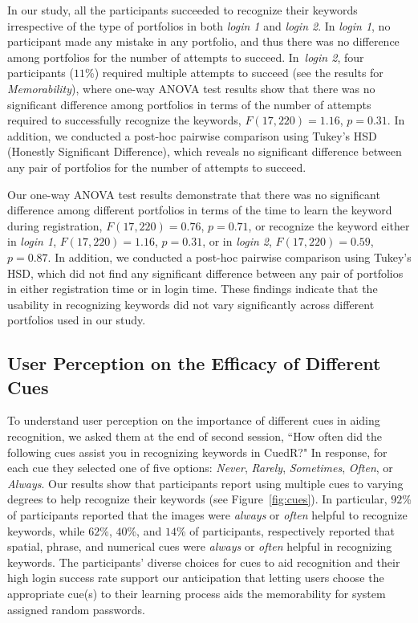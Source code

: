 In our study, all the participants succeeded to recognize their keywords irrespective of the type of portfolios in both \textit{login 1} and \textit{login 2}. In \textit{login 1}, no participant made any mistake in any portfolio, and thus there was no difference among portfolios for the number of attempts to succeed. In~\textit{login 2}, four participants ($11$\%) required multiple attempts to succeed (see the results for \textit{Memorability}), where one-way ANOVA test results show that there was no significant difference among portfolios in terms of the number of attempts required to successfully recognize the keywords, $F(17,220)=1.16$, $p=0.31$. In addition, we conducted a post-hoc pairwise comparison using Tukey's HSD (Honestly Significant Difference), which reveals no significant difference between any pair of portfolios for the number of attempts to succeed. 

Our one-way ANOVA test results demonstrate that there was no significant difference among different portfolios in terms of the time to learn the keyword during registration, $F(17,220)=0.76$, $p=0.71$, or recognize the keyword either in \textit{login 1}, $F(17,220)=1.16$, $p=0.31$, or in \textit{login 2}, $F(17,220)=0.59$, $p=0.87$. In addition, we conducted a post-hoc pairwise comparison using Tukey's HSD, which did not find any significant difference between any pair of portfolios in either registration time or in login time. These findings indicate that the usability in recognizing keywords did not vary significantly across different portfolios used in our study.

\subsection{User Perception on the Efficacy of Different Cues}\label{effect_cues} 

To understand user perception on the importance of different cues in aiding recognition, we asked them at the end of second session, ``How often did the following cues assist you in recognizing keywords in CuedR?" In response, for each cue they selected one of five options: \textit{Never}, \textit{Rarely}, \textit{Sometimes}, \textit{Often}, or \textit{Always}. Our results show that participants report using multiple cues to varying degrees to help recognize their keywords (see Figure~\ref{fig:cues}). In particular, $92$\% of participants reported that the images were \textit{always} or \textit{often} helpful to recognize keywords, while $62$\%, $40$\%, and $14$\% of participants, respectively reported that spatial, phrase, and numerical cues were \textit{always} or \textit{often} helpful in recognizing keywords. The participants' diverse choices for cues to aid recognition and their high login success rate support our anticipation that letting users choose the appropriate cue(s) to their learning process aids the memorability for system assigned random passwords. 

